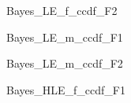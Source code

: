 \documentclass[a4j,11pt,mc]{jreport}
\begin{document}
	\begin{figure}[H]
		\begin{center}
				\caption{Bayes\_LE\_f\_ccdf\_F2}
		\end{center}
	\end{figure}



	\begin{figure}[H]
		\begin{center}
				\caption{Bayes\_LE\_m\_ccdf\_F1}
		\end{center}
	\end{figure}


	\begin{figure}[H]
		\begin{center}
				\caption{Bayes\_LE\_m\_ccdf\_F2}
		\end{center}
	\end{figure}




	\begin{figure}[H]
		\begin{center}
				\caption{Bayes\_HLE\_f\_ccdf\_F1}
		\end{center}
	\end{figure}
\end{document}
